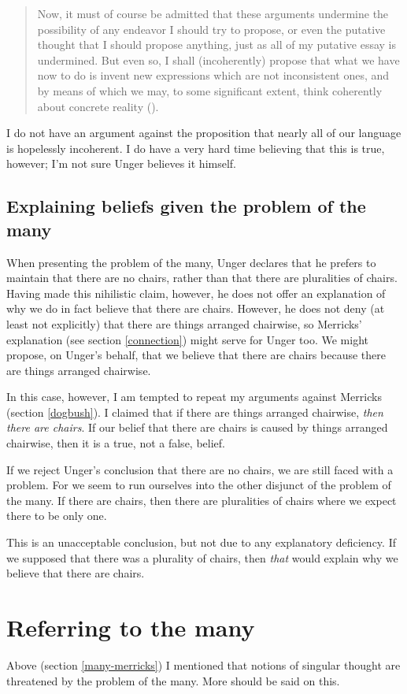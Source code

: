 \documentclass[11pt]{article}
\newenvironment{squote}{%
	\begin{quote}\begin{singlespace}%
	}{%
	\end{singlespace}\end{quote}}
\begin{document}
\begin{spacing}{1.5}
\begin{squote}
Now, it must of course be admitted that these arguments undermine the
possibility of any endeavor I should try to propose, or even the
putative thought that I should propose anything, just as all of my
putative essay is undermined.  But even so, I shall (incoherently)
propose that what we have now to do is invent new expressions which
are not inconsistent ones, and by means of which we may, to some
significant extent, think coherently about concrete reality
(\citeyear[544]{unger1980b}).
\end{squote}

I do not have an argument against the proposition that nearly all of
our language is hopelessly incoherent.  I do have a very hard time
believing that this is true, however; I'm not sure Unger believes it
himself.

\subsection{Explaining beliefs given the problem of the many}
\label{expl-many}
When presenting the problem of the many, Unger declares that he
prefers to maintain that there are no chairs, rather than that there
are pluralities of chairs.  Having made this nihilistic claim,
however, he does not offer an explanation of why we do in fact believe
that there are chairs.  However, he does not deny (at least not
explicitly) that there are things arranged chairwise, so Merricks'
explanation (see section \ref{connection}) might serve for Unger too.
We might propose, on Unger's behalf, that we believe that there are
chairs because there are things arranged chairwise.

In this case, however, I am tempted to repeat my arguments against
Merricks (section \ref{dogbush}).  I claimed that if there are things
arranged chairwise, {\em then there are chairs}.  If our belief that
there are chairs is caused by things arranged chairwise, then it is a
true, not a false, belief.

If we reject Unger's conclusion that there are no chairs, we are still
faced with a problem.  For we seem to run ourselves into the other
disjunct of the problem of the many.  If there are chairs, then there
are pluralities of chairs where we expect there to be only one.

This is an unacceptable conclusion, but not due to any explanatory
deficiency.  If we supposed that there was a plurality of chairs, then
{\em that} would explain why we believe that there are chairs.

\section{Referring to the many}
\label{refer}
Above (section \ref{many-merricks}) I mentioned that notions of
singular thought are threatened by the problem of the many.  More
should be said on this.

\ifstandalone


\end{spacing}
\fi
\end{document}
